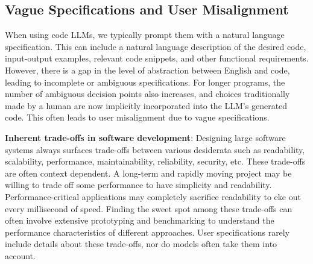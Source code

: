 \vspace{-0.2cm}

\subsection{Vague Specifications and User Misalignment} \label{sec:c-specifications}

\vspace{-0.1cm}


When using code LLMs, we typically prompt them with a natural language specification. This can include a natural language description of the desired code, input-output examples, relevant code snippets, and other functional requirements. However, there is a gap in the level of abstraction between English and code, leading to incomplete or ambiguous specifications. For longer programs, the number of ambiguous decision points also increases, and choices traditionally made by a human are now 
implicitly incorporated into the LLM's generated code. This often leads to user misalignment due to vague specifications.

\textbf{Inherent trade-offs in software development}: Designing large software systems always surfaces trade-offs between various desiderata such as readability, scalability, performance, maintainability, reliability, security, etc. These trade-offs are often context dependent. A long-term and rapidly moving project may be willing to trade off some performance to have simplicity and readability. Performance-critical applications may completely sacrifice readability to eke out every millisecond of speed. 
Finding the sweet spot among these trade-offs can often involve extensive prototyping and benchmarking to understand the performance characteristics of different approaches. User specifications rarely include details about these trade-offs, nor do models often take them into account.


